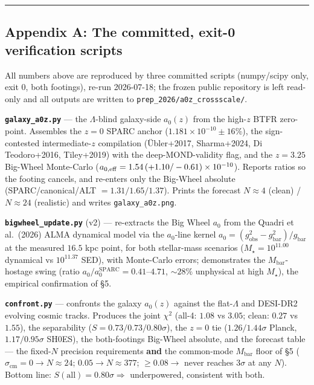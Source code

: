 \documentclass[
]{article}
\begin{document}
\begin{center}\rule{0.5\linewidth}{0.5pt}\end{center}

\subsection{Appendix A: The committed, exit-0 verification
scripts}\label{appendix-a-the-committed-exit-0-verification-scripts}

All numbers above are reproduced by three committed scripts (numpy/scipy
only, exit 0, both footings), re-run 2026-07-18; the frozen public
repository is left read-only and all outputs are written to
\texttt{prep\_2026/a0z\_crossscale/}.

\textbf{\texttt{galaxy\_a0z.py}} --- the \(\Lambda\)-blind galaxy-side
\(a_0(z)\) from the high-\(z\) BTFR zero-point. Assembles the \(z=0\)
SPARC anchor (\(1.181\times10^{-10}\pm16\%\)), the sign-contested
intermediate-\(z\) compilation (Übler+2017, Sharma+2024, Di
Teodoro+2016, Tiley+2019) with the deep-MOND-validity flag, and the
\(z=3.25\) Big-Wheel Monte-Carlo
(\(a_{0,\rm eff}=1.54\,(+1.10/-0.61)\times10^{-10}\)). Reports ratios so
the footing cancels, and re-enters only the Big-Wheel absolute
(SPARC/canonical/ALT \(=1.31/1.65/1.37\)). Prints the forecast
\(N\approx4\) (clean) / \(N\approx24\) (realistic) and writes
\texttt{galaxy\_a0z.png}.

\textbf{\texttt{bigwheel\_update.py}} (v2) --- re-extracts the Big Wheel
\(a_0\) from the Quadri et al.~(2026) ALMA dynamical model via the
\(a_0\)-line kernel \(a_0=(g_\mathrm{obs}^2-g_\mathrm{bar}^2)/g_\mathrm{bar}\) at
the measured \(16.5\) kpc point, for both stellar-mass scenarios
(\(M_\star=10^{11.00}\) dynamical vs \(10^{11.37}\) SED), with
Monte-Carlo errors; demonstrates the \(M_\mathrm{bar}\)-hostage swing
(ratio \(a_0/a_0^\mathrm{SPARC}=0.41\)--\(4.71\), \(\sim28\%\) unphysical
at high \(M_\star\)), the empirical confirmation of §5.

\textbf{\texttt{confront.py}} --- confronts the galaxy \(a_0(z)\)
against the flat-\(\Lambda\) and DESI-DR2 evolving cosmic tracks.
Produces the joint \(\chi^2\) (all-4: \(1.08\) vs \(3.05\); clean:
\(0.27\) vs \(1.55\)), the separability (\(S=0.73/0.73/0.80\sigma\)),
the \(z=0\) tie (\(1.26/1.44\sigma\) Planck, \(1.17/0.95\sigma\) SH0ES),
the both-footings Big-Wheel absolute, and the forecast table --- the
fixed-\(N\) precision requirements \textbf{and} the common-mode
\(M_\mathrm{bar}\) floor of §5 (\(\sigma_\mathrm{cm}=0\to N\!\approx\!24\);
\(0.05\to N\!\approx\!377\); \(\ge0.08\to\) never reaches \(3\sigma\) at
any \(N\)). Bottom line: \(S(\text{all})=0.80\sigma\Rightarrow\)
underpowered, consistent with both.
\end{document}
